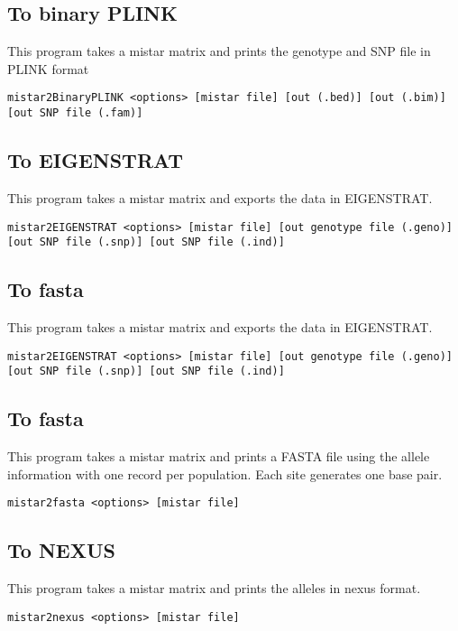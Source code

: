 \documentclass[a4paper]{article}
\begin{document}
\subsection{To binary PLINK}

This program takes a mistar matrix and prints the genotype and SNP file in PLINK format

\tiny
\begin{verbatim}
mistar2BinaryPLINK <options> [mistar file] [out (.bed)] [out (.bim)] [out SNP file (.fam)]
\end{verbatim}
\normalsize

\subsection{To EIGENSTRAT}
This program takes a mistar matrix and exports the data in EIGENSTRAT.
\tiny
\begin{verbatim}
mistar2EIGENSTRAT <options> [mistar file] [out genotype file (.geno)] [out SNP file (.snp)] [out SNP file (.ind)]
\end{verbatim}
\normalsize

\subsection{To fasta}
This program takes a mistar matrix and exports the data in EIGENSTRAT.
\tiny
\begin{verbatim}
mistar2EIGENSTRAT <options> [mistar file] [out genotype file (.geno)] [out SNP file (.snp)] [out SNP file (.ind)]
\end{verbatim}
\normalsize
\subsection{To fasta}

This program takes a mistar matrix and prints a FASTA file using the allele information with one record per population. Each site generates one base pair.

\begin{verbatim}
mistar2fasta <options> [mistar file] 
\end{verbatim}

\subsection{To NEXUS}

This program takes a mistar matrix and prints the alleles in nexus format.

\begin{verbatim}
mistar2nexus <options> [mistar file]
\end{verbatim}






\newpage





%

\end{document}
